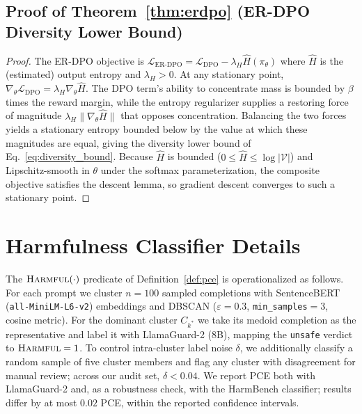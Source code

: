 \subsection{Proof of Theorem~\ref{thm:erdpo} (ER-DPO Diversity Lower Bound)}

\begin{proof}
The ER-DPO objective is $\mathcal{L}_{\text{ER-DPO}} = \mathcal{L}_{\text{DPO}} - \lambda_H \hat{H}(\pi_\theta)$ where $\hat{H}$ is the (estimated) output entropy and $\lambda_H>0$. At any stationary point, $\nabla_\theta \mathcal{L}_{\text{DPO}} = \lambda_H \nabla_\theta \hat{H}$. The DPO term's ability to concentrate mass is bounded by $\beta$ times the reward margin, while the entropy regularizer supplies a restoring force of magnitude $\lambda_H \|\nabla_\theta \hat{H}\|$ that opposes concentration. Balancing the two forces yields a stationary entropy bounded below by the value at which these magnitudes are equal, giving the diversity lower bound of Eq.~\eqref{eq:diversity_bound}. Because $\hat{H}$ is bounded ($0\leq \hat{H}\leq \log|\mathcal{V}|$) and Lipschitz-smooth in $\theta$ under the softmax parameterization, the composite objective satisfies the descent lemma, so gradient descent converges to such a stationary point.
\end{proof}

\section{Harmfulness Classifier Details}
\label{app:harmful_classifier}

The $\textsc{Harmful}(\cdot)$ predicate of Definition~\ref{def:pce} is operationalized as follows. For each prompt we cluster $n=100$ sampled completions with SentenceBERT (\texttt{all-MiniLM-L6-v2}) embeddings and DBSCAN ($\varepsilon=0.3$, \texttt{min\_samples}$=3$, cosine metric). For the dominant cluster $C_{k^*}$ we take its medoid completion as the representative and label it with LlamaGuard-2 (8B), mapping the \texttt{unsafe} verdict to $\textsc{Harmful}=1$. To control intra-cluster label noise $\delta$, we additionally classify a random sample of five cluster members and flag any cluster with disagreement for manual review; across our audit set, $\delta < 0.04$. We report PCE both with LlamaGuard-2 and, as a robustness check, with the HarmBench classifier; results differ by at most $0.02$ PCE, within the reported confidence intervals.
